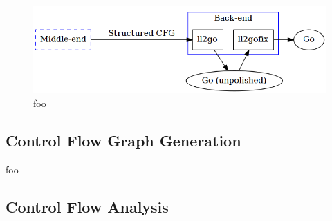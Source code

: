 \begin{figure}[htbp]
	\begin{center}
		\includegraphics[width=\textwidth]{inc/back-end.png}
		\caption{foo}
		\label{fig:back-end}
	\end{center}
\end{figure}








\subsection{Control Flow Graph Generation}

foo


\subsection{Control Flow Analysis}

